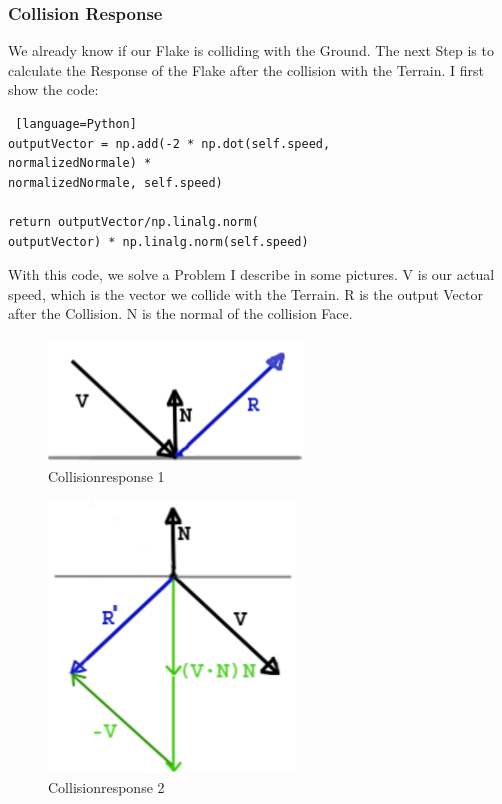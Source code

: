 \documentclass{sig-alternate-05-2015}
\begin{document}
\subsubsection{Collision Response}
We already know if our Flake is colliding with the Ground. The next Step is to calculate the Response of the Flake after the collision with the Terrain. I first show the code: \\
\begin{lstlisting} [language=Python]
outputVector = np.add(-2 * np.dot(self.speed, 
normalizedNormale) * 
normalizedNormale, self.speed)

return outputVector/np.linalg.norm(
outputVector) * np.linalg.norm(self.speed)
\end{lstlisting}
With this code, we solve a Problem I describe in some pictures. 
V is our actual speed, which is the vector we collide with the Terrain. R is the output Vector after the Collision. N is the normal of the collision Face. 

\begin{figure}[!htbp]
  \begin{center}
\includegraphics[scale=0.75]{CollisionResponse1Terrain.png}
  \end{center}
  \caption{Collisionresponse 1}
\end{figure}
\begin{figure}[!htbp]
  \begin{center}
\includegraphics[scale=0.75]{CollisionResponse2Terrain.png}
  \end{center}
  \caption{Collisionresponse 2}
\end{figure}
\end{document}
